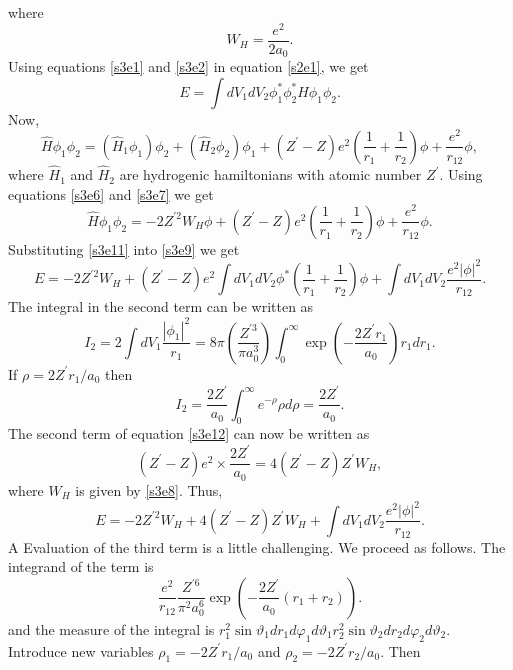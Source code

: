 \documentclass{article}
\numberwithin{equation}{section}
\begin{document}
where 
\begin{equation}\label{s3e8}
W_H = \frac{e^2}{2a_0}.
\end{equation}
Using equations \eqref{s3e1} and \eqref{s3e2} in equation \eqref{s2e1}, we get
\begin{equation}\label{s3e9}
E = \int dV_1 dV_2 \phi_1^\ast\phi_2^\ast\hat{H}\phi_1\phi_2.
\end{equation}
Now, 
\begin{equation}\label{s3e10}
\hat{H}\phi_1\phi_2 = (\hat{H}_1\phi_1)\phi_2 + (\hat{H}_2\phi_2)\phi_1 + (Z^\prime - Z)e^2\left(\frac{1}{r_1} + \frac{1}{r_2}\right)\phi + \frac{e^2}{r_{12}}\phi,
\end{equation}
where $\hat{H}_1$ and $\hat{H}_2$ are hydrogenic hamiltonians with atomic number
$Z^\prime$. Using equations \eqref{s3e6} and \eqref{s3e7} we get
\begin{equation}\label{s3e11}
\hat{H}\phi_1\phi_2 = -2Z^{\prime 2}W_H\phi + (Z^\prime - Z)e^2\left(\frac{1}{r_1} + \frac{1}{r_2}\right)\phi + \frac{e^2}{r_{12}}\phi.
\end{equation}
Substituting \eqref{s3e11} into \eqref{s3e9} we get
\begin{equation}\label{s3e12}
E = -2Z^{\prime 2}W_H + (Z^\prime - Z)e^2\int dV_1dV_2\phi^\ast\left(\frac{1}{r_1} + \frac{1}{r_2}\right)\phi + \int dV_1dV_2\frac{e^2|\phi|^2}{r_{12}}.
\end{equation}
The integral in the second term can be written as
\[
I_2 = 2\int dV_1\frac{|\phi_1|^2}{r_1} = 8\pi\left(\frac{Z^{\prime 3}}{\pi a_0^3}\right)\int_0^\infty\exp\left(-\frac{2Z^\prime r_1}{a_0}\right)r_1 dr_1.
\]
If $\rho = 2Z^\prime r_1/a_0$ then
\[
I_2 = \frac{2Z^\prime}{a_0}\int_0^\infty e^{-\rho}\rho d\rho = \frac{2Z^\prime}{a_0}.
\]
The second term of equation \eqref{s3e12} can now be written as
\[
(Z^\prime - Z)e^2 \times \frac{2Z^\prime}{a_0} = 4(Z^\prime - Z)Z^\prime W_H,
\]
where $W_H$ is given by \eqref{s3e8}. Thus,
\begin{equation}\label{s3e13}
E = -2Z^{\prime 2}{W_H} + 4(Z^\prime - Z)Z^\prime W_H +  \int dV_1dV_2\frac{e^2|\phi|^2}{r_{12}}.
\end{equation}A
Evaluation of the third term is a little challenging. We proceed as follows. 
The integrand of the term is
\[
\frac{e^2}{r_{12}}\frac{Z^{\prime 6}}{\pi^2 a_0^6}\exp\left(-\frac{2Z^\prime}{a_0}(r_1 + r_2)\right).
\]
and the measure of the integral is $r_1^2\sin\vartheta_1dr_1d\varphi_1 d\vartheta_1 r_2^2\sin\vartheta_2dr_2d\varphi_2 d\vartheta_2$.
Introduce new variables $\rho_1 = -2Z^\prime r_1/a_0$ and $\rho_2 = -2Z^\prime r_2/a_0$. Then
\end{document}

